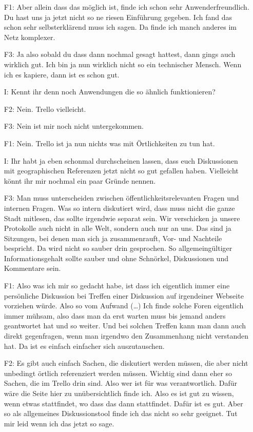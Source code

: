 \begin{itemize}
    \item[F1:] Aber allein dass das möglich ist, finde ich schon sehr Anwenderfreundlich. Du hast uns ja jetzt nicht so ne riesen Einführung gegeben. Ich fand das schon sehr selbsterklärend muss ich sagen. Da finde ich manch anderes im Netz komplexer.
    \item[F3:] Ja also sobald du dass dann nochmal gesagt hattest, dann gings auch wirklich gut. Ich bin ja nun wirklich nicht so ein technischer Mensch. Wenn ich es kapiere, dann ist es schon gut.
    \item[I:] Kennt ihr denn noch Anwendungen die so ähnlich funktionieren?
    \item[F2:] Nein. Trello vielleicht.
    \item[F3:] Nein ist mir noch nicht untergekommen.
    \item[F1:] Nein. Trello ist ja nun nichts was mit {\"O}rtlichkeiten zu tun hat.
    \item[I:] Ihr habt ja eben schonmal durchscheinen lassen, dass euch Diskussionen mit geographischen Referenzen jetzt nicht so gut gefallen haben. Vielleicht könnt ihr mir nochmal ein paar Gründe nennen.
    \item[F3:] Man muss unterscheiden zwischen öffentlichkeitsrelevanten Fragen und internen Fragen. Was so intern diskutiert wird, dass muss nicht die ganze Stadt mitlesen, das sollte irgendwie separat sein. Wir verschicken ja unsere Protokolle auch nicht in alle Welt, sondern auch nur an uns. Das sind ja Sitzungen, bei denen man sich ja zusammenrauft, Vor- und Nachteile bespricht. Da wird nicht so sauber drin gesprochen. So allgemeingültiger Informationsgehalt sollte sauber und ohne Schnörkel, Diskussionen und Kommentare sein.
    \item[F1:] Also was ich mir so gedacht habe, ist dass ich eigentlich immer eine persönliche Diskussion bei Treffen einer Diskussion auf irgendeiner Webseite vorziehen würde. Also so vom Aufwand (\dots) Ich finde solche Foren eigentlich immer mühsam, also dass man da erst warten muss bis jemand anders geantwortet hat und so weiter. Und bei solchen Treffen kann man dann auch direkt gegenfragen, wenn man irgendwo den Zusammenhang nicht verstanden hat. Da ist es einfach einfacher sich auszutauschen.
    \item[F2:] Es gibt auch einfach Sachen, die diskutiert werden müssen, die aber nicht unbedingt örtlich referenziert werden müssen. Wichtig sind dann eher so Sachen, die im Trello drin sind. Also wer ist für was verantwortlich. Dafür wäre die Seite hier zu unübersichtlich finde ich. Also es ist gut zu wissen, wenn etwas stattfindet, wo dass das dann stattfindet. Dafür ist es gut. Aber so als allgemeines Diskussionstool finde ich das nicht so sehr geeignet. Tut mir leid wenn ich das jetzt so sage.

\end{itemize}

